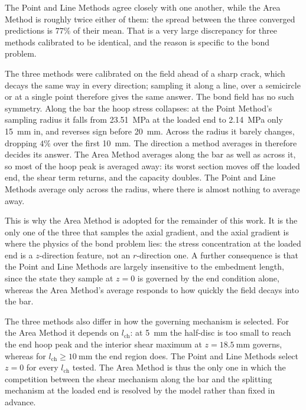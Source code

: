 The Point and Line Methods agree closely with one another, while the Area
Method is roughly twice either of them: the spread between the three
converged predictions is $77\%$ of their mean. That is a very large
discrepancy for three methods calibrated to be identical, and the reason is
specific to the bond problem.
 
The three methods were calibrated on the field ahead of a sharp crack, which
decays the same way in every direction; sampling it along a line, over a
semicircle or at a single point therefore gives the same answer. The bond
field has no such symmetry. Along the bar the hoop stress collapses: at the
Point Method's sampling radius it falls from \SI{23.51}{\mega\pascal} at the
loaded end to \SI{2.14}{\mega\pascal} only \SI{15}{\milli\metre} in, and
reverses sign before \SI{20}{\milli\metre}. Across the radius it barely
changes, dropping $4\%$ over the first \SI{10}{\milli\metre}. The direction a
method averages in therefore decides its answer. The Area Method averages
along the bar as well as across it, so most of the hoop peak is averaged
away: its worst section moves off the loaded end, the shear term returns, and
the capacity doubles. The Point and Line Methods average only across the
radius, where there is almost nothing to average away.
 
This is why the Area Method is adopted for the remainder of this work. It is
the only one of the three that samples the axial gradient, and the axial
gradient is where the physics of the bond problem lies: the stress
concentration at the loaded end is a $z$-direction feature, not an
$r$-direction one. A further consequence is that the Point and Line Methods
are largely insensitive to the embedment length, since the state they sample
at $z = 0$ is governed by the end condition alone, whereas the Area Method's
average responds to how quickly the field decays into the bar.
 
The three methods also differ in how the governing mechanism is selected. For
the Area Method it depends on $l_{\mathrm{ch}}$: at \SI{5}{\milli\metre} the
half-disc is too small to reach the end hoop peak and the interior shear
maximum at $z = \SI{18.5}{\milli\metre}$ governs, whereas for
$l_{\mathrm{ch}} \ge \SI{10}{\milli\metre}$ the end region does. The Point
and Line Methods select $z = 0$ for every $l_{\mathrm{ch}}$ tested. The Area
Method is thus the only one in which the competition between the shear
mechanism along the bar and the splitting mechanism at the loaded end is
resolved by the model rather than fixed in advance.


